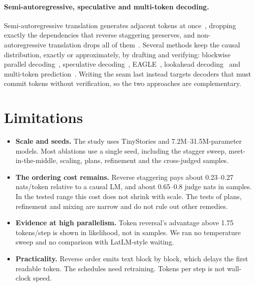\documentclass[11pt]{article}
\theoremstyle{definition}
\theoremstyle{remark}
\begin{document}
\paragraph{Semi-autoregressive, speculative and multi-token decoding.}
Semi-autoregressive translation generates adjacent tokens at once~\citep{wang2018semi}, dropping exactly the dependencies that reverse staggering preserves, and non-autoregressive translation drops all of them~\citep{gu2018nat}.
Several methods keep the causal distribution, exactly or approximately, by drafting and verifying: blockwise parallel decoding~\citep{stern2018blockwise}, speculative decoding~\citep{leviathan2023speculative,chen2023speculative}, EAGLE~\citep{li2024eagle}, lookahead decoding~\citep{fu2024lookahead} and multi-token prediction~\citep{gloeckle2024mtp}.
Writing the seam last instead targets decoders that must commit tokens without verification, so the two approaches are complementary.

\section{Limitations}
\label{sec:limitations}

\begin{itemize}
  \item \textbf{Scale and seeds.} The study uses TinyStories and 7.2M--31.5M-parameter models. Most ablations use a single seed, including the stagger sweep, meet-in-the-middle, scaling, plans, refinement and the cross-judged samples.
  \item \textbf{The ordering cost remains.} Reverse staggering pays about 0.23--0.27 nats/token relative to a causal LM, and about 0.65--0.8 judge nats in samples. In the tested range this cost does not shrink with scale. The tests of plans, refinement and mixing are narrow and do not rule out other remedies.
  \item \textbf{Evidence at high parallelism.} Token reversal's advantage above 1.75 tokens/step is shown in likelihood, not in samples. We ran no temperature sweep and no comparison with LatLM-style waiting.
  \item \textbf{Practicality.} Reverse order emits text block by block, which delays the first readable token. The schedules need retraining. Tokens per step is not wall-clock speed.
\end{itemize}

\end{document}
